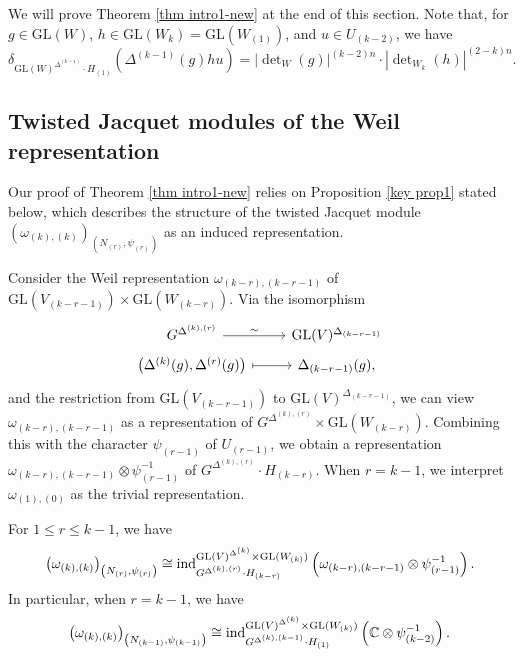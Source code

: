 \documentclass[11pt,reqno]{amsart}
\renewcommand{\1}{{\mathbf{1}}} \newcommand{\sB}{{\mathscr{B}}}
\newcommand{\BC}{{\mathbb {C}}} \newcommand{\BD}{{\mathbb {D}}}
\newcommand{\GL}{{\mathrm{GL}}}\newcommand{\G}{{\mathrm{G}}}
\theoremstyle{plain}
\theoremstyle{definition}
\numberwithin{equation}{section}
\begin{document}
We will prove Theorem \ref{thm intro1-new} at the end of this section. Note that, for $g\in\GL(W)$, $h\in\GL(W_k)=\GL(W_{(1)})$, and $u\in U_{(k-2)}$, we have
$$\delta_{\GL(W)^{\Delta^{(k-1)}}\cdot H_{(1)}}\left(\Delta^{(k-1)}(g)hu\right)=|\det\nolimits_W(g)|^{(k-2)n}\cdot
|\det\nolimits_{W_k}(h)|^{(2-k)n}.$$

\subsection{Twisted Jacquet modules of the Weil representation} Our proof of Theorem \ref{thm intro1-new} relies on Proposition \ref{key prop1} stated below, which describes the structure of the twisted Jacquet module  $\left(\omega_{(k),(k)}\right)_{\left(N_{(r)},\psi_{(r)}\right)}$ as an induced representation. 

Consider the Weil representation 
$\omega_{(k-r),(k-r-1)}$ of $\GL(V_{(k-r-1)})\times\GL(W_{(k-r)})$. Via  the isomorphism
\begin{equation}\label{equ gp-isom1}\begin{tikzcd}[row sep=0.1cm]
	{G^{\Delta^{(k),(r)}}} & {\GL(V)^{\Delta_{(k-r-1)}}} \\
	{\left(\Delta^{(k)}(g),\Delta^{(r)}(g)\right)} & {\Delta_{(k-r-1)}(g)},
	\arrow["\sim", from=1-1, to=1-2]
	\arrow[maps to, from=2-1, to=2-2]
\end{tikzcd}\end{equation}
and the restriction from $\GL(V_{(k-r-1)})$ to $\GL(V)^{\Delta_{(k-r-1)}}$,  we can view $\omega_{(k-r),(k-r-1)}$ as a representation of $G^{\Delta^{(k),(r)}}\times\GL(W_{(k-r)})$.  Combining this with the character $\psi_{(r-1)}$ of $U_{(r-1)}$, we obtain a representation $\omega_{(k-r),(k-r-1)}\otimes\psi_{(r-1)}^{-1}$ of $G^{\Delta^{(k),(r)}}\cdot H_{(k-r)}$.
When $r=k-1$, we interpret  $\omega_{(1),(0)}$ as the trivial representation.


\begin{prop}\label{key prop1}
For $1\leq r\leq k-1$, we have
$$\left(\omega_{(k),(k)}\right)_{\left(N_{(r)},\psi_{(r)}\right)}\cong\ind_{G^{\Delta^{(k),(r)}}\cdot H_{(k-r)}}^{\GL(V)^{\Delta^{(k)}}\times\GL(W_{(k)})}\left(\omega_{(k-r),(k-r-1)}\otimes\psi_{(r-1)}^{-1}\right).$$
 In particular, when $r=k-1$, we have
$$\left(\omega_{(k),(k)}\right)_{\left(N_{(k-1)},\psi_{(k-1)}\right)}\cong\ind_{G^{\Delta^{(k),(k-1)}}\cdot H_{(1)}}^{\GL(V)^{\Delta^{(k)}}\times\GL(W_{(k)})}\left(\BC\otimes\psi_{(k-2)}^{-1}\right).$$ 
\end{prop}
\end{document}
